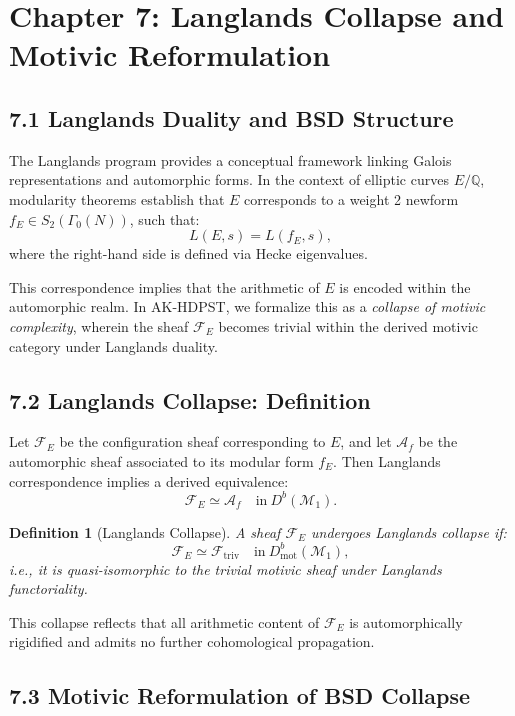 \documentclass[11pt]{article}
\newtheorem{definition}[theorem]{Definition}
\begin{document}
\section{Chapter 7: Langlands Collapse and Motivic Reformulation}
\label{sec:langlands-collapse}

\subsection*{7.1 Langlands Duality and BSD Structure}

The Langlands program provides a conceptual framework linking Galois representations and automorphic forms. In the context of elliptic curves \( E/\mathbb{Q} \), modularity theorems establish that \( E \) corresponds to a weight 2 newform \( f_E \in S_2(\Gamma_0(N)) \), such that:
\[
L(E, s) = L(f_E, s),
\]
where the right-hand side is defined via Hecke eigenvalues.

This correspondence implies that the arithmetic of \( E \) is encoded within the automorphic realm. In AK-HDPST, we formalize this as a \emph{collapse of motivic complexity}, wherein the sheaf \( \mathcal{F}_E \) becomes trivial within the derived motivic category under Langlands duality.

\subsection*{7.2 Langlands Collapse: Definition}

Let \( \mathcal{F}_E \) be the configuration sheaf corresponding to \( E \), and let \( \mathcal{A}_f \) be the automorphic sheaf associated to its modular form \( f_E \). Then Langlands correspondence implies a derived equivalence:
\[
\mathcal{F}_E \simeq \mathcal{A}_f \quad \text{in}~D^b(\mathcal{M}_1).
\]

\begin{definition}[Langlands Collapse]
\label{def:langlands-collapse}
A sheaf \( \mathcal{F}_E \) undergoes Langlands collapse if:
\[
\mathcal{F}_E \simeq \mathcal{F}_{\text{triv}} \quad \text{in}~D^b_{\text{mot}}(\mathcal{M}_1),
\]
i.e., it is quasi-isomorphic to the trivial motivic sheaf under Langlands functoriality.
\end{definition}

This collapse reflects that all arithmetic content of \( \mathcal{F}_E \) is automorphically rigidified and admits no further cohomological propagation.

\subsection*{7.3 Motivic Reformulation of BSD Collapse}
\end{document}
